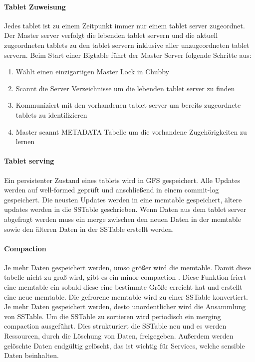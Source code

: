 \paragraph{Tablet Zuweisung}
Jedes tablet ist zu einem Zeitpunkt immer nur einem tablet server zugeordnet. Der Master server verfolgt die lebenden tablet servern und die aktuell zugeordneten tablets zu den tablet servern inklusive aller unzugeordneten tablet servern.
Beim Start einer Bigtable führt der Master Server folgende Schritte aus:

\begin{enumerate}
	\item Wählt einen einzigartigen Master Lock in Chubby
	\item Scannt die Server Verzeichnisse um die lebenden tablet server zu finden
	\item Kommuniziert mit den vorhandenen tablet server um bereits zugeordnete tablets zu identifizieren
	\item Master scannt METADATA Tabelle um die vorhandene Zugehörigkeiten zu lernen
\end{enumerate}

\paragraph{Tablet serving}
Ein persistenter Zustand eines tablets wird in GFS gespeichert. Alle Updates werden auf \glqq well-formed \grqq geprüft und anschließend in einem commit-log gespeichert. Die neusten Updates werden in eine memtable gespeichert, ältere updates werden in die SSTable geschrieben. Wenn Daten aus dem tablet server abgefragt werden muss ein merge zwischen den neuen Daten in der memtable sowie den älteren Daten in der SSTable erstellt werden.

\paragraph{Compaction}
Je mehr Daten gespeichert werden, umso größer wird die memtable. Damit diese tabelle nicht zu groß wird, gibt es ein \glqq minor compaction \grqq. Diese Funktion friert eine memtable ein sobald diese eine bestimmte Größe erreicht hat und erstellt eine neue memtable. Die gefrorene memtable wird zu einer SSTable konvertiert. Je mehr Daten gespeichert werden, desto unordentlicher wird die Ansammlung von SSTable. Um die SSTable zu sortieren wird periodisch ein \glqq merging compaction \grqq ausgeführt. Dies strukturiert die SSTable neu und es werden Ressourcen, durch die Löschung von Daten, freigegeben. Außerdem werden gelöschte Daten endgültig gelöscht, das ist wichtig für Services, welche sensible Daten beinhalten.

